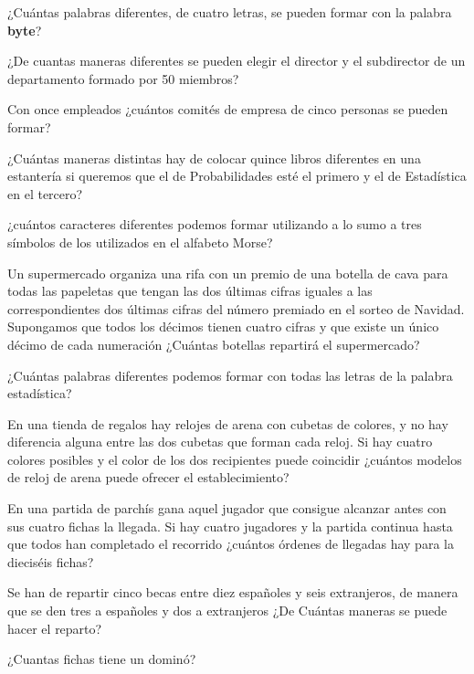 \documentclass[12pt]{article}
\begin{document}
\probl  ¿Cuántas palabras diferentes, de cuatro letras, se pueden
formar con la palabra {\bf byte}? 

\probl  ¿De cuantas maneras diferentes se pueden elegir el director y el subdirector de
un departamento formado por 50 miembros? 

\probl  Con once empleados ¿cuántos comités de  empresa de cinco
personas se pueden formar? 

\probl  ¿Cuántas maneras distintas hay de colocar quince libros diferentes en una
estantería si queremos  que el  de Probabilidades esté el  primero y  el de Estadística
en el tercero? 

\probl  ¿cuántos caracteres diferentes podemos formar utilizando a lo sumo  a tres
símbolos  de los utilizados en el alfabeto Morse? 

\probl  Un supermercado  organiza una rifa con un premio de  una botella de cava para
todas las papeletas que tengan las dos últimas cifras iguales a las correspondientes dos
últimas cifras del número premiado en el sorteo de Navidad. Supongamos que todos los
décimos tienen cuatro cifras y que existe un único décimo de cada numeración ¿Cuántas
botellas repartirá el supermercado? 

\probl  ¿Cuántas  palabras diferentes podemos formar con todas las letras de la palabra
estadística? 

\probl  En una tienda de regalos hay relojes de  arena con cubetas
de colores, y no hay diferencia alguna entre las  dos cubetas que
forman cada reloj. Si hay cuatro  colores posibles y el color de
los dos recipientes puede coincidir ¿cuántos  modelos de reloj de
arena puede ofrecer el establecimiento? 

\probl  En una partida de parchís gana aquel jugador que consigue alcanzar antes  con sus
cuatro fichas la llegada. Si hay  cuatro jugadores y la partida continua hasta que todos
han completado el recorrido ¿cuántos  órdenes de llegadas hay para la dieciséis fichas?

\probl  Se han de repartir cinco becas entre diez españoles  y seis extranjeros, de
manera que se den tres a españoles y dos a extranjeros ¿De Cuántas maneras se puede hacer
el reparto? 

\probl  ¿Cuantas  fichas tiene un dominó? 
\end{document}
